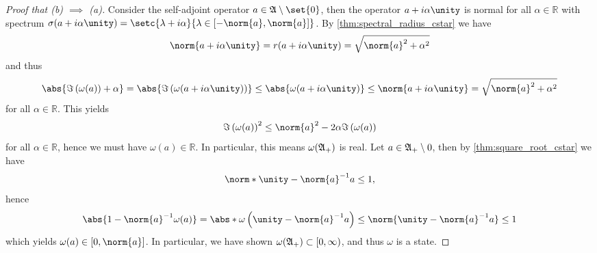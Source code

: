 \begin{proof}[Proof that (b) \(\implies\) (a)]
    Consider the self-adjoint operator \(a \in \algebra{A} \setminus \set{0}\), then the operator \(a + i\alpha \unity\) is normal for all \(\alpha \in \mathbb{R}\) with spectrum \(\sigma(a + i \alpha \unity) = \setc{\lambda + i \alpha}{\lambda \in [-\norm{a}, \norm{a}]}\). By \cref{thm:spectral_radius_cstar} we have
    \begin{equation*}
        \norm{a + i \alpha \unity} = r(a + i \alpha \unity) = \sqrt{\norm{a}^2 + \alpha^2}
    \end{equation*}
    and thus
    \begin{equation*}
        \abs{\Im\left(\omega(a)\right) + \alpha} = \abs{\Im\left(\omega(a + i \alpha \unity)\right)} \leq \abs{\omega(a + i \alpha \unity)} \leq \norm{a + i \alpha \unity} = \sqrt{\norm{a}^2 + \alpha^2}
    \end{equation*}
    for all \(\alpha \in \mathbb{R}\). This yields
    \begin{equation*}
        \Im\left(\omega(a)\right)^2 \leq \norm{a}^2 - 2 \alpha \Im\left(\omega(a)\right)
    \end{equation*}
    for all \(\alpha \in \mathbb{R}\), hence we must have \(\omega(a) \in \mathbb{R}\). In particular, this means \(\omega(\mathfrak{A}_+)\) is real. Let \(a \in \mathfrak{A}_+\setminus{0}\), then by \cref{thm:square_root_cstar} we have
    \begin{equation*}
        \norm*{\unity - \norm{a}^{-1}a} \leq 1,
    \end{equation*}
    hence
    \begin{equation*}
        \abs{1 - \norm{a}^{-1} \omega(a)} = \abs*{\omega\left(\unity - \norm{a}^{-1}a\right)} \leq \norm{\unity - \norm{a}^{-1}a} \leq 1
    \end{equation*}
    which yields \(\omega(a) \in [0, \norm{a}]\). In particular, we have shown \(\omega(\mathfrak{A}_+) \subset [0, \infty)\), and thus \(\omega\) is a state.
\end{proof}
